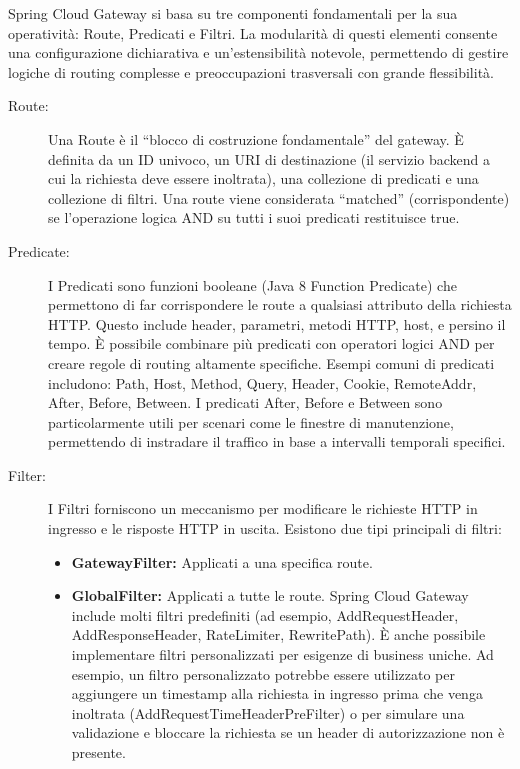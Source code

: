Spring Cloud Gateway si basa su tre componenti fondamentali per la sua operatività: Route, Predicati e Filtri. La modularità di questi elementi consente una configurazione dichiarativa e un'estensibilità notevole, permettendo di gestire logiche di routing complesse e preoccupazioni trasversali con grande flessibilità.
\begin{description}
    \item[Route:] Una Route è il \enquote{blocco di costruzione fondamentale} del gateway. È definita da un ID univoco, un URI di destinazione (il servizio backend a cui la richiesta deve essere inoltrata), una collezione di predicati e una collezione di filtri. Una route viene considerata \enquote{matched} (corrispondente) se l'operazione logica AND su tutti i suoi predicati restituisce true.
    
    \item[Predicate:] I Predicati sono funzioni booleane (Java 8 Function Predicate) che permettono di far corrispondere le route a qualsiasi attributo della richiesta HTTP. Questo include header, parametri, metodi HTTP, host, e persino il tempo. È possibile combinare più predicati con operatori logici AND per creare regole di routing altamente specifiche.
    Esempi comuni di predicati includono: Path, Host, Method, Query, Header, Cookie, RemoteAddr, After, Before, Between. I predicati After, Before e Between sono particolarmente utili per scenari come le finestre di manutenzione, permettendo di instradare il traffico in base a intervalli temporali specifici.
    \item[Filter:] I Filtri forniscono un meccanismo per modificare le richieste HTTP in ingresso e le risposte HTTP in uscita. Esistono due tipi principali di filtri:
    \begin{itemize}
        \item \textbf{GatewayFilter:} Applicati a una specifica route.
        \item \textbf{GlobalFilter:} Applicati a tutte le route. Spring Cloud Gateway include molti filtri predefiniti (ad esempio, AddRequestHeader, AddResponseHeader, RateLimiter, RewritePath). È anche possibile implementare filtri personalizzati per esigenze di business uniche. Ad esempio, un filtro personalizzato potrebbe essere utilizzato per aggiungere un timestamp alla richiesta in ingresso prima che venga inoltrata (AddRequestTimeHeaderPreFilter) o per simulare una validazione e bloccare la richiesta se un header di autorizzazione non è presente.
    \end{itemize}
\end{description}


